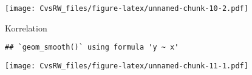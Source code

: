 \documentclass[
]{article}
\newenvironment{Shaded}{\begin{snugshade}}{\end{snugshade}}
\newcommand{\DataTypeTok}[1]{\textcolor[rgb]{0.13,0.29,0.53}{#1}}
\newcommand{\DecValTok}[1]{\textcolor[rgb]{0.00,0.00,0.81}{#1}}
\newcommand{\FloatTok}[1]{\textcolor[rgb]{0.00,0.00,0.81}{#1}}
\newcommand{\KeywordTok}[1]{\textcolor[rgb]{0.13,0.29,0.53}{\textbf{#1}}}
\newcommand{\NormalTok}[1]{#1}
\newcommand{\OperatorTok}[1]{\textcolor[rgb]{0.81,0.36,0.00}{\textbf{#1}}}
\newcommand{\OtherTok}[1]{\textcolor[rgb]{0.56,0.35,0.01}{#1}}
\newcommand{\StringTok}[1]{\textcolor[rgb]{0.31,0.60,0.02}{#1}}
\begin{document}
\begin{Shaded}
\end{Shaded}

\texttt{[image: CvsRW\_files/figure-latex/unnamed-chunk-10-2.pdf]}

Korrelation

\begin{Shaded}
\end{Shaded}

\begin{verbatim}
## `geom_smooth()` using formula 'y ~ x'
\end{verbatim}

\texttt{[image: CvsRW\_files/figure-latex/unnamed-chunk-11-1.pdf]}

\begin{Shaded}
\end{Shaded}
\end{document}
